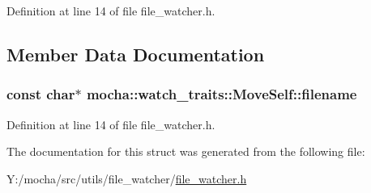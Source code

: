 Definition at line 14 of file file\_\-watcher.h.



\subsection{Member Data Documentation}
\hypertarget{structmocha_1_1watch__traits_1_1_move_self_a11e8ec2b20d41ecb619d1e382c8a0bfb}{
\subsubsection[{filename}]{\setlength{\rightskip}{0pt plus 5cm}const char$\ast$ {\bf mocha::watch\_\-traits::MoveSelf::filename}}}
\label{structmocha_1_1watch__traits_1_1_move_self_a11e8ec2b20d41ecb619d1e382c8a0bfb}


Definition at line 14 of file file\_\-watcher.h.



The documentation for this struct was generated from the following file:\begin{DoxyCompactItemize}
\item 
Y:/mocha/src/utils/file\_\-watcher/\hyperlink{file__watcher_8h}{file\_\-watcher.h}\end{DoxyCompactItemize}
